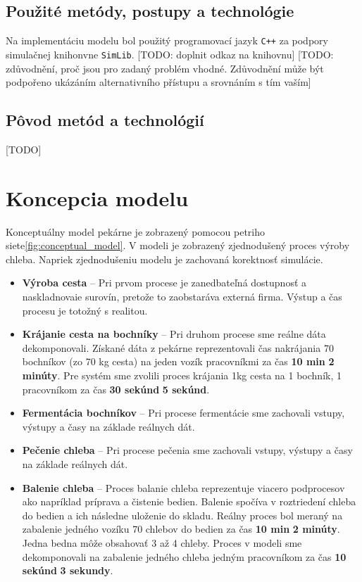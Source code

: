\documentclass[a4paper, 10pt]{article}
\begin{document}
    \subsection{Použité metódy, postupy a technológie}
    Na implementáciu modelu bol použitý programovací jazyk \texttt{C++} za podpory simulačnej knihonvne \texttt{SimLib}.
    [TODO: doplnit odkaz na knihovnu] [TODO: zdůvodnění, proč jsou pro zadaný problém vhodné. Zdůvodnění může být podpořeno ukázáním alternativního přístupu a srovnáním s tím vaším]
    \subsection{Pôvod metód a technológií}
    [TODO]

    \section {Koncepcia modelu}
    Konceptuálny model pekárne je zobrazený pomocou petriho siete\ref{fig:conceptual_model}.
    V modeli je zobrazený zjednodušený proces výroby chleba. Napriek zjednodušeniu modelu je zachovaná korektnosť simulácie.
    \begin{itemize}
        \item \textbf{Výroba cesta} -- Pri prvom procese je zanedbateľná dostupnosť a naskladnovaie surovín,
        pretože to zaobstaráva externá firma. Výstup a čas procesu je totožný s realitou.

        \item \textbf{Krájanie cesta na bochníky} -- Pri druhom procese sme reálne dáta dekomponovali. Získané
        dáta z pekárne reprezentovali čas nakrájania 70 bochníkov (zo 70 kg cesta) na jeden vozík pracovníkmi za čas \textbf{10 min} \textpm \textbf{ 2 minúty}.
        Pre systém sme zvolili proces krájania 1kg cesta na 1 bochník, 1 pracovníkom za čas \textbf{30 sekúnd} \textpm \textbf{ 5 sekúnd}.

        \item \textbf{Fermentácia bochníkov} -- Pri procese fermentácie sme zachovali vstupy, výstupy a časy na základe reálnych dát.

        \item \textbf{Pečenie chleba} -- Pri procese pečenia sme zachovali vstupy, výstupy a časy na základe reálnych dát.

        \item \textbf{Balenie chleba} -- Proces balanie chleba reprezentuje viacero podprocesov ako napríklad príprava a čistenie bedien.
        Balenie spočíva v roztriedení chleba do bedien a ich následne uloženie do skladu. Reálny proces bol meraný na
        zabalenie jedného vozíku 70 chlebov do bedien za čas \textbf{10 min} \textpm \textbf{ 2 minúty}. Jedna bedna môže obsahovať 3 až 4 chleby. Proces v modeli sme dekomponovali
        na zabalenie jedného chleba jedným pracovníkom za čas \textbf{10 sekúnd} \textpm \textbf{ 3 sekundy}.
    \end{itemize}
\end{document}
